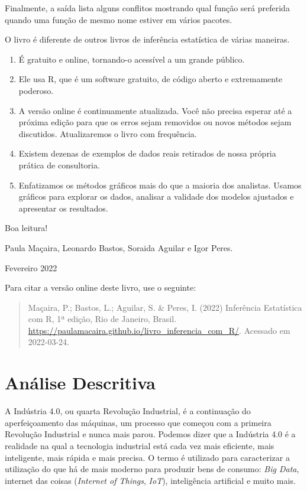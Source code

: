 \documentclass[
]{book}
\providecommand{\tightlist}{%
  \setlength{\itemsep}{0pt}\setlength{\parskip}{0pt}}
\begin{document}
Finalmente, a saída lista alguns conflitos mostrando qual função será preferida quando uma função de mesmo nome estiver em vários pacotes.

O livro é diferente de outros livros de inferência estatística de várias maneiras.

\begin{enumerate}
\def\labelenumi{\arabic{enumi}.}
\tightlist
\item
  É gratuito e online, tornando-o acessível a um grande público.
\item
  Ele usa R, que é um software gratuito, de código aberto e extremamente poderoso.
\item
  A versão online é continuamente atualizada. Você não precisa esperar até a próxima edição para que os erros sejam removidos ou novos métodos sejam discutidos. Atualizaremos o livro com frequência.
\item
  Existem dezenas de exemplos de dados reais retirados de nossa própria prática de consultoria.
\item
  Enfatizamos os métodos gráficos mais do que a maioria dos analistas. Usamos gráficos para explorar os dados, analisar a validade dos modelos ajustados e apresentar os resultados.
\end{enumerate}

Boa leitura!

Paula Maçaira, Leonardo Bastos, Soraida Aguilar e Igor Peres.

Fevereiro 2022

Para citar a versão online deste livro, use o seguinte:

\begin{quote}
Maçaira, P.; Bastos, L.; Aguilar, S. \& Peres, I. (2022) Inferência Estatística com R, 1ª edição, Rio de Janeiro, Brasil. \url{https://paulamacaira.github.io/livro_inferencia_com_R/}. Acessado em 2022-03-24.
\end{quote}

\hypertarget{analise_descritiva}{%
\chapter{Análise Descritiva}\label{analise_descritiva}}

A Indústria 4.0, ou quarta Revolução Industrial, é a continuação do aperfeiçoamento das máquinas, um processo que começou com a primeira Revolução Industrial e nunca mais parou. Podemos dizer que a Indústria 4.0 é a realidade na qual a tecnologia industrial está cada vez mais eficiente, mais inteligente, mais rápida e mais precisa. O termo é utilizado para caracterizar a utilização do que há de mais moderno para produzir bens de consumo: \emph{Big Data}, internet das coisas (\emph{Internet of Things}, \emph{IoT}), inteligência artificial e muito mais.
\end{document}
